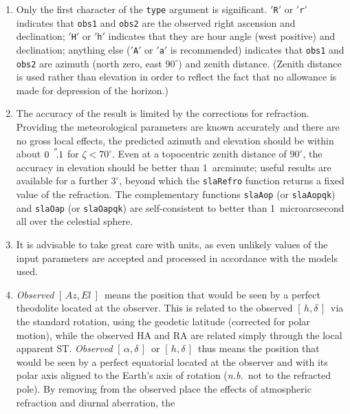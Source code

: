 \documentclass[11pt,fleqn,twoside]{article}
\renewcommand{\_}{{\tt\char'137}}     %
\newcommand{\radec}     {$[\,\alpha,\delta\,]$}
\newcommand{\hadec}     {$[\,h,\delta\,]$}
\newcommand{\azel}      {$[\,Az,El~]$}
\newcommand{\arcseci}[1] {$#1\hspace{0.05em}$\raisebox{-0.5ex}
                         {$^{'\hspace{-0.1em}'\hspace{0.0em}}$}}
\newcommand{\arcsec}[2] {\arcseci{#1}$\hspace{-0.35em}.#2$}
\newcommand{\fstring}[1]{\hspace{0.05em}\mbox{$'${\tt#1}\hspace{0.09em}$'$}}
\begin{document}
{
 \begin{enumerate}
  \item Only the first character of the
        {\tt type} argument is significant.
        \fstring{R} or \fstring{r} indicates that
        {\tt obs1} and {\tt obs2} are the observed right
        ascension and declination;
        \fstring{H} or \fstring{h} indicates that they are
        hour angle (west positive) and declination;
        anything else (\fstring{A} or \fstring{a}
        is recommended) indicates that
        {\tt obs1} and {\tt obs2} are azimuth
        (north zero, east $90^{\circ}$) and zenith distance.  (Zenith
        distance is used rather than elevation in order to reflect the
        fact that no allowance is made for depression of the horizon.)
  \item The accuracy of the result is limited by the corrections for
        refraction.  Providing the meteorological parameters are
        known accurately and there are no gross local effects, the
        predicted azimuth and elevation should be within about
        \arcsec{0}{1} for $\zeta<70^{\circ}$.  Even
        at a topocentric zenith distance of
        $90^{\circ}$, the accuracy in elevation should be better than
        1~arcminute;  useful results are available for a further
        $3^{\circ}$, beyond which the {\tt slaRefro} function returns a
        fixed value of the refraction.  The complementary
        functions {\tt slaAop} (or {\tt slaAopqk}) and {\tt slaOap} (or {\tt slaOapqk})
        are self-consistent to better than 1~microarcsecond all over
        the celestial sphere.
  \item It is advisable to take great care with units, as even
        unlikely values of the input parameters are accepted and
        processed in accordance with the models used.
  \item {\it Observed}\/ \azel\ means the position that would be seen by a
        perfect theodolite located at the observer.  This is
        related to the observed \hadec\ via the standard rotation, using
        the geodetic latitude (corrected for polar motion), while the
        observed HA and RA are related simply through the local
        apparent ST.  {\it Observed}\/ \radec\ or \hadec\ thus means the
        position that would be seen by a perfect equatorial located
        at the observer and with its polar axis aligned to the
        Earth's axis of rotation ({\it n.b.}\ not to the refracted pole).
        By removing from the observed place the effects of
        atmospheric refraction and diurnal aberration, the

\end{enumerate}}
\end{document}
